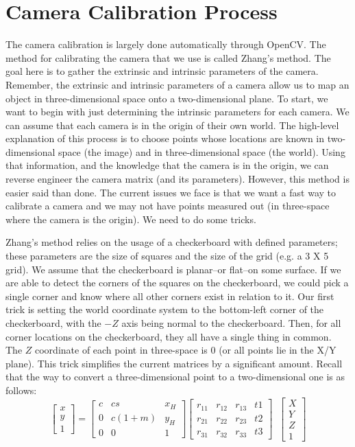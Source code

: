\documentclass[12pt,twoside]{reedthesis}
\begin{document}
\section{Camera Calibration Process}
The camera calibration is largely done automatically through OpenCV. The method for calibrating the camera that we use is called Zhang's method. The goal here is to gather the extrinsic and intrinsic parameters of the camera. Remember, the extrinsic and intrinsic parameters of a camera allow us to map an object in three-dimensional space onto a two-dimensional plane. To start, we want to begin with just determining the intrinsic parameters for each camera. We can assume that each camera is in the origin of their own world. The high-level explanation of this process is to choose points whose locations are known in two-dimensional space (the image) and in three-dimensional space (the world). Using that information, and the knowledge that the camera is in the origin, we can reverse engineer the camera matrix (and its parameters). However, this method is easier said than done. The current issues we face is that we want a fast way to calibrate a camera and we may not have points measured out (in three-space where the camera is the origin). We need to do some tricks.

Zhang's method relies on the usage of a checkerboard with defined parameters; these parameters are the size of squares and the size of the grid (e.g. a 3 X 5 grid). We assume that the checkerboard is planar–or flat–on some surface. If we are able to detect the corners of the squares on the checkerboard, we could pick a single corner and know where all other corners exist in relation to it. Our first trick is setting the world coordinate system to the bottom-left corner of the checkerboard, with the $-Z$ axis being normal to the checkerboard. Then, for all corner locations on the checkerboard, they all have a single thing in common. The $Z$ coordinate of each point in three-space is 0 (or all points lie in the X/Y plane). This trick simplifies the current matrices by a significant amount. Recall that the way to convert a three-dimensional point to a two-dimensional one is as follows:
\[\begin{bmatrix}x \\ y \\ 1\end{bmatrix} = \begin{bmatrix}c & cs & x_H \\ 0 & c(1+m) & y_H \\ 0 & 0 & 1\end{bmatrix} \begin{bmatrix} r_{11}&r_{12}&r_{13}&t{1}\\r_{21}&r_{22}&r_{23}&t{2}\\r_{31}&r_{32}&r_{33}&t{3}\end{bmatrix}\;\;\begin{bmatrix}X \\ Y \\ Z \\ 1\end{bmatrix} \]
\end{document}
